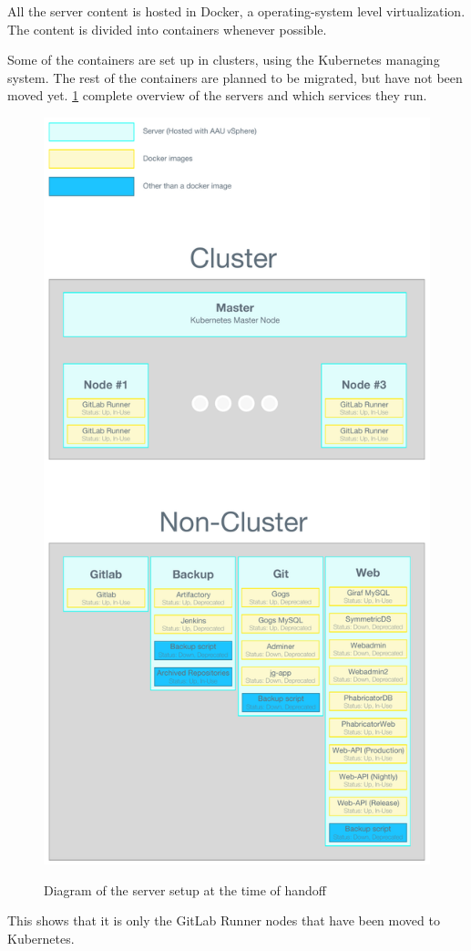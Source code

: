 
All the server content is hosted in Docker, a operating-system level virtualization. The content is divided into containers whenever possible. 

Some of the containers are set up in clusters, using the Kubernetes managing system. The rest of the containers are planned to be migrated, but have not been moved yet. \ref{fig:state-at-handoff:server} complete overview of the servers and which services they run.

\begin{figure}[h]
    \centering
    \caption{Diagram of the server setup at the time of handoff\cite[p.~74]{SW611F18}}
    \includegraphics[height=1\textheight]{figures/Server-Overview.pdf}
    \label{fig:state-at-handoff:server}
\end{figure}

This shows that it is only the GitLab Runner nodes that have been moved to Kubernetes. 




